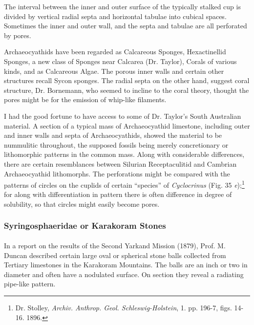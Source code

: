 \documentclass[a4paper, 12pt, oneside, landscape]{article}
\begin{document}
The interval between the inner and outer surface of the typically stalked cup is divided by vertical radial septa and horizontal tabulae into cubical spaces. Sometimes the inner and outer wall, and the septa and tabulae are all perforated by pores.

Archaeocyathids have been regarded as Calcareous Sponges, Hexactinellid Sponges, a new class of Sponges near Calcarea (Dr. Taylor), Corals of various kinds, and as Calcareous Algae. The porous inner walls and certain other structures recall Sycon sponges. The radial septa on the other hand, suggest coral structure, Dr. Bornemann, who seemed to incline to the coral theory, thought the pores might be for the emission of whip-like filaments.

I had the good fortune to have access to some of Dr. Taylor's South Australian material. A section of a typical mass of Archaeocyathid limestone, including outer and inner walls and septa of Archaeocyathids, showed the material to be nummulitic throughout, the supposed fossils being merely concretionary or lithomorphic patterns in the common mass. Along with considerable differences, there are certain resemblances between Silurian Receptaculitid and Cambrian Archaeocyathid lithomorphs. The perforations might be compared with the patterns of circles on the cuplids of certain ``species'' of \emph{Cyclocrinus} (Fig. 35 \emph{e});\footnote{Dr. Stolley, \emph{Archiv. Anthrop. Geol. Schleswig-Holstein}, 1. pp. 196-7, figs. 14-16. 1896.} for along with differentiation in pattern there is often difference in degree of solubility, so that circles might easily become pores.

\subsubsection{Syringosphaeridae or Karakoram Stones}
\paragraph{}
In a report on the results of the Second Yarkand Mission (1879), Prof. M. Duncan described certain large oval or spherical stone balls collected from Tertiary limestones in the Karakoram Mountains. The balls are an inch or two in diameter and often have a nodulated surface. On section they reveal a radiating pipe-like pattern.
\end{document}
